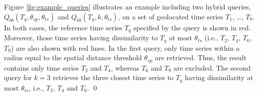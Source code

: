 \begin{myexample}
 Figure \ref{fig:example_queries} illustrates an example including two hybrid queries, $Q_{bb}(T_q, \theta_{sp}, \theta_{ts})$ and $Q_{kb}(T_q, k, \theta_{ts})$, on a set of geolocated time series $T_1$, \ldots, $T_9$. In both cases, the reference time series $T_q$ specified by the query is shown in red. Moreover, those time series having dissimilarity to $T_q$ at most $\theta_{ts}$ (i.e., $T_2$, $T_4$, $T_6$, $T_9$) are also shown with red lines. In the first query, only time series within a radius equal to the spatial distance threshold $\theta_{sp}$ are retrieved. Thus, the result contains only time series $T_2$ and $T_4$, whereas $T_6$ and $T_9$ are excluded. The second query for $k=3$ retrieves the three closest time series to $T_q$ having dissimilarity at most $\theta_{ts}$, i.e., $T_2$, $T_4$ and $T_6$. \qed
\end{myexample}